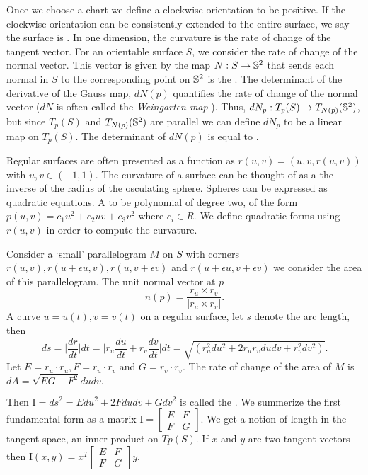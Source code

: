 Once we choose a chart we define a clockwise orientation to be positive.
 If the clockwise
orientation can be consistently extended to the entire surface, we say
the surface is .
In one dimension, the curvature is the rate of change of the tangent vector.
For an orientable surface $S$, we consider the rate of change of the normal vector.
This vector is given by the map  $N:S\to \mathbb{S}^2$ that sends each
normal in $S$ to the corresponding point on $\mathbb{S}^2$ is
the .
The determinant of the derivative of the Gauss map, $dN(p)$ quantifies the rate of change of
the normal vector ($dN$ is often called the \emph{Weingarten map} \cite{Crane:2013}).
Thus, $dN_p:T_p(S)\to T_{N(p)}(\mathbb{S}^2)$, but since $T_p(S)$ and $T_{N(p)}(\mathbb{S}^2)$
are parallel we can define $dN_p$ to be a linear map on $T_p(S)$.
The determinant of $dN(p)$ is equal to .



Regular surfaces are often presented as a function as $r(u,v)=(u,v,r(u,v))$
with $u,v\in(-1,1)$.
The curvature of a surface can be thought of as a the inverse of
the radius of the osculating sphere. Spheres can be expressed
as quadratic equations.  A
  to be polynomial of degree two, of the form $p(u,v)=c_1u^2+c_2uv+c_3v^2$ 
where $c_i\in R$.
We define quadratic forms using $r(u,v)$ in order to compute the curvature.


Consider a `small' parallelogram $M$ on $S$ with corners $r(u,v),r(u+\epsilon u, v), r(u,v+\epsilon v)$ 
and $r(u+\epsilon u, v+\epsilon v)$ we consider the area of this parallelogram.
The unit normal vector at $p$ $$n(p)=\frac{r_u\times r_v}{|r_u\times r_v|}.$$
A curve $u=u(t), v=v(t)$ on a regular surface, let
$s$ denote the arc length, then 
$$ds=\bigg | \frac{dr}{dt}\bigg | dt = \bigg | r_u\frac{du}{dt}+r_v\frac{dv}{dt}\bigg |dt
=\sqrt{(r_u^2 du^2+2r_ur_v du dv + r_v^2dv^2)}.$$
Let $E=r_u\cdot r_u, F=r_u\cdot r_v$ and  $G=r_v\cdot r_v$.
The rate of change of the area of $M$ is 
$dA=\sqrt{EG-F^2}dudv.$

Then $\mathrm{I}=ds^2=Edu^2+2Fdudv +Gdv^2$ is called the .
We summerize the first fundamental form as a matrix $\mathrm{I}=\begin{bmatrix}
E & F \\
F & G 
\end{bmatrix}.$
We get a notion of length in the tangent space, an inner product on $Tp(S)$.
If $x$ and $y$ are two tangent vectors
then $\mathrm{I}(x,y)=x^T\begin{bmatrix}
E & F \\
F & G 
\end{bmatrix}y.$



